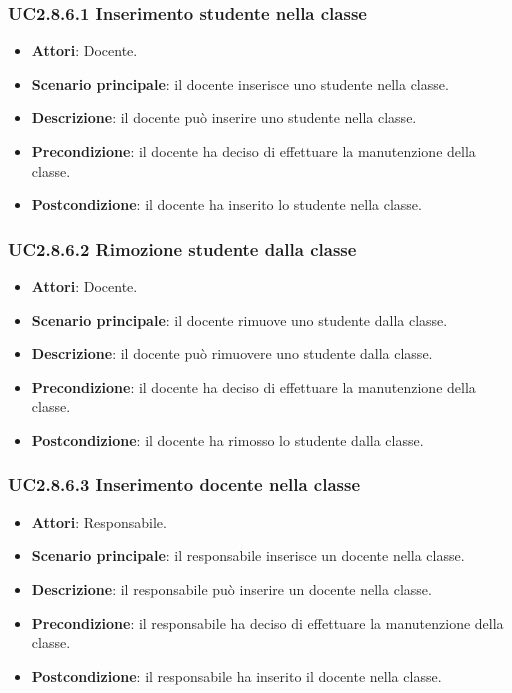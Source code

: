 \subsubsection{UC2.8.6.1 Inserimento studente nella classe}
\begin{itemize}
\item \textbf{Attori}: Docente.
\item \textbf{Scenario principale}: il docente inserisce uno studente nella classe.
\item \textbf{Descrizione}: il docente può inserire uno studente nella classe.
\item \textbf{Precondizione}: il docente ha deciso di effettuare la manutenzione della classe.
\item \textbf{Postcondizione}: il docente ha inserito lo studente nella classe.
\end{itemize}
\subsubsection{UC2.8.6.2 Rimozione studente dalla classe}
\begin{itemize}
\item \textbf{Attori}: Docente.
\item \textbf{Scenario principale}: il docente rimuove uno studente dalla classe.
\item \textbf{Descrizione}: il docente può rimuovere uno studente dalla classe.
\item \textbf{Precondizione}: il docente ha deciso di effettuare la manutenzione della classe.
\item \textbf{Postcondizione}: il docente ha rimosso lo studente dalla classe.
\end{itemize}
\subsubsection{UC2.8.6.3 Inserimento docente nella classe}
\begin{itemize}
\item \textbf{Attori}: Responsabile.
\item \textbf{Scenario principale}: il responsabile inserisce un docente nella classe.
\item \textbf{Descrizione}: il responsabile può inserire un docente nella classe.
\item \textbf{Precondizione}: il responsabile ha deciso di effettuare la manutenzione della classe.
\item \textbf{Postcondizione}: il responsabile ha inserito il docente nella classe.
\end{itemize}
